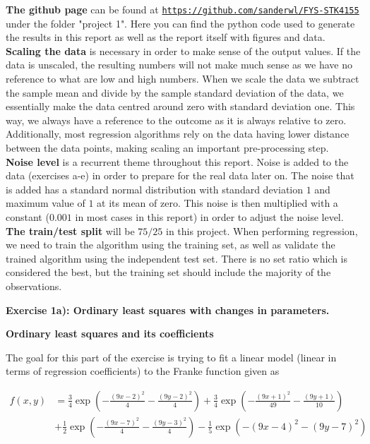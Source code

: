 \documentclass[12pt,a4paper]{article}
\begin{document}
\noindent \textbf{The github page} can be found at \href{{https://github.com/sanderwl/FYS-STK4155}}{\nolinkurl{https://github.com/sanderwl/FYS-STK4155}} under the folder "project 1". Here you can find the python code used to generate the results in this report as well as the report itself with figures and data.
\\
\textbf{Scaling the data} is necessary in order to make sense of the output values. If the data is unscaled, the resulting numbers will not make much sense as we have no reference to what are low and high numbers. When we scale the data we subtract the sample mean and divide by the sample standard deviation of the data, we essentially make the data centred around zero with standard deviation one. This way, we always have a reference to the outcome as it is always relative to zero. Additionally, most regression algorithms rely on the data having lower distance between the data points, making scaling an important pre-processing step.
\\
\textbf{Noise level} is a recurrent theme throughout this report. Noise is added to the data (exercises a-e) in order to prepare for the real data later on. The noise that is added has a standard normal distribution with standard deviation $1$ and maximum value of $1$ at its mean of zero. This noise is then multiplied with a constant ($0.001$ in most cases in this report) in order to adjust the noise level. 
\\
\textbf{The train/test split} will be $75/25$ in this project. When performing regression, we need to train the algorithm using the training set, as well as validate the trained algorithm using the independent test set. There is no set ratio which is considered the best, but the training set should include the majority of the observations. 

\newpage

\begin{center}
\Large{\textbf{Exercise 1a): Ordinary least squares with changes in parameters.}}
\end{center}

\begin{center}
\large{\textbf{Ordinary least squares and its coefficients}}
\end{center}

\noindent The goal for this part of the exercise is trying to fit a linear model (linear in terms of regression coefficients) to the Franke function given as

\begin{equation}\label{eq:Franke}
\begin{aligned}
f(x,y) &= \frac{3}{4}\exp{\left(-\frac{(9x-2)^2}{4} - \frac{(9y-2)^2}{4}\right)}+\frac{3}{4}\exp{\left(-\frac{(9x+1)^2}{49}- \frac{(9y+1)}{10}\right)} \\
&+\frac{1}{2}\exp{\left(-\frac{(9x-7)^2}{4} - \frac{(9y-3)^2}{4}\right)} -\frac{1}{5}\exp{\left(-(9x-4)^2 - (9y-7)^2\right) }
\end{aligned}
\end{equation}
\end{document}
